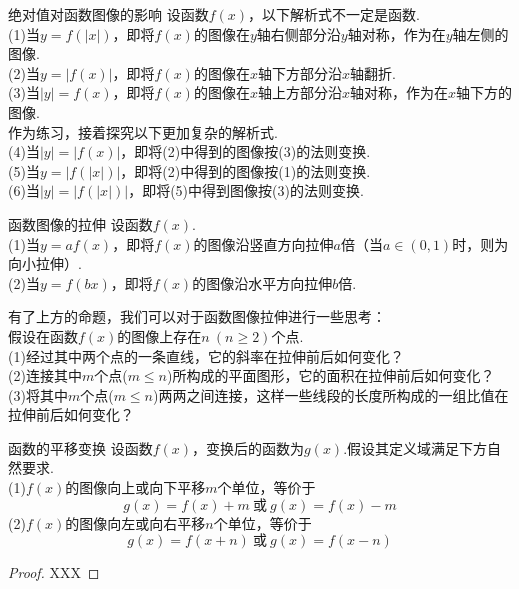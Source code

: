 \documentclass[lang=cn, zihao=5]{elegantbook}
\begin{document}
\begin{proposition}{绝对值对函数图像的影响}
    设函数$f(x)$，以下解析式不一定是函数.\\
    (1)当$y=f(|x|)$，即将$f(x)$的图像在$y$轴右侧部分沿$y$轴对称，作为在$y$轴左侧的图像.\\
    (2)当$y=|f(x)|$，即将$f(x)$的图像在$x$轴下方部分沿$x$轴翻折.\\
    (3)当$|y|=f(x)$，即将$f(x)$的图像在$x$轴上方部分沿$x$轴对称，作为在$x$轴下方的图像.\\
    作为练习，接着探究以下更加复杂的解析式.\\
    (4)当$|y|=|f(x)|$，即将(2)中得到的图像按(3)的法则变换.\\
    (5)当$y=|f(|x|)|$，即将(2)中得到的图像按(1)的法则变换.\\
    (6)当$|y|=|f(|x|)|$，即将(5)中得到图像按(3)的法则变换.
\end{proposition}

\begin{proposition}{函数图像的拉伸}
    设函数$f(x)$.\\
    (1)当$y=af(x)$，即将$f(x)$的图像沿竖直方向拉伸$a$倍（当$a\in (0,1)$时，则为向小拉伸）.\\
    (2)当$y=f(b x)$，即将$f(x)$的图像沿水平方向拉伸$b$倍.
\end{proposition}

\begin{problem}
    有了上方的命题，我们可以对于函数图像拉伸进行一些思考：\\
    假设在函数$f(x)$的图像上存在$n~(n \geq 2)$个点.\\
    (1)经过其中两个点的一条直线，它的斜率在拉伸前后如何变化？\\
    (2)连接其中$m$个点($m \leq n$)所构成的平面图形，它的面积在拉伸前后如何变化？\\
    (3)将其中$m$个点($m \leq n$)两两之间连接，这样一些线段的长度所构成的一组比值在拉伸前后如何变化？\\
\end{problem}

\begin{proposition}{函数的平移变换}
    设函数$f(x)$，变换后的函数为$g(x)$.假设其定义域满足下方自然要求.\\
    (1)$f(x)$的图像向上或向下平移$m$个单位，等价于$$g(x)=f(x)+m \ \text{或} \ g(x)=f(x)-m$$
    (2)$f(x)$的图像向左或向右平移$n$个单位，等价于$$g(x)=f(x+n) \ \text{或} \ g(x)=f(x-n)$$
\end{proposition}
\begin{proof}
    XXX
\end{proof}
\end{document}
